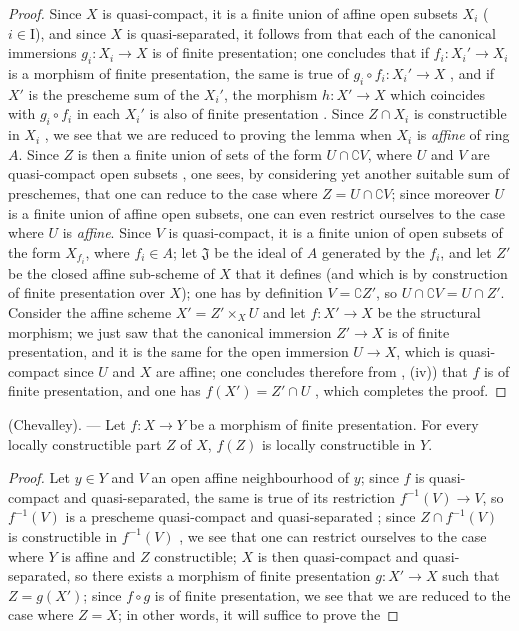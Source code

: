 \begin{proof}
Since $X$ is quasi-compact, it is a finite union of affine open subsets $X_i$ ($i\in\mathrm{I}$), and since $X$ is quasi-separated, it follows from  that each of the canonical immersions $g_i:X_i\to X$ is of finite presentation; one concludes that if $f_i:X_i'\to X_i$ is a morphism of finite presentation, the same is true of $g_i\circ f_i:X_i'\to X$ , and if $X'$ is the prescheme sum of the $X_i'$, the morphism $h:X'\to X$ which coincides with $g_i\circ f_i$ in each $X_i'$ is also of finite presentation .
Since $Z\cap X_i$ is constructible in $X_i$ , we see that we are reduced to proving the lemma when $X_i$ is \emph{affine} of ring $A$.
Since $Z$ is then a finite union of sets of the form $U\cap\complement V$, where $U$ and $V$ are
quasi-compact open subsets , one sees, by considering yet another suitable sum of preschemes, that one can reduce to the case where $Z=U\cap\complement V$; since moreover $U$ is a finite union of affine open subsets, one can even restrict ourselves to the case where $U$ is \emph{affine}.
Since $V$ is quasi-compact, it is a finite union of open subsets of the form $X_{f_i}$, where $f_i\in A$; let $\mathfrak{J}$ be the ideal of $A$ generated by the $f_i$, and let $Z'$ be the closed affine sub-scheme of $X$ that it defines (and which is by construction of finite presentation over $X$); one has by definition $V=\complement Z'$, so $U\cap\complement V=U\cap Z'$.
Consider the affine scheme $X'=Z'\times_X U$
and let $f:X'\to X$ be the structural morphism; we just saw that the canonical immersion $Z'\to X$ is of finite presentation, and it is the same for the open immersion $U\to X$, which is quasi-compact since $U$ and $X$ are affine; one concludes therefore from , (iv)) that $f$ is of finite presentation, and one has $f(X')=Z'\cap U$ , which completes the proof.
\end{proof}

\begin{theorem}[1.8.4]
\label{IV.1.8.4}
\textup{(Chevalley).} ---
Let $f:X\to Y$ be a morphism of finite presentation.
For every locally constructible part $Z$ of $X$, $f(Z)$ is locally constructible in $Y$.
\end{theorem}

\begin{proof}
Let $y\in Y$ and $V$ an open affine neighbourhood of $y$; since $f$ is quasi-compact and quasi-separated, the same is true of its restriction $f^{-1}(V)\to V$, so $f^{-1}(V)$ is a prescheme quasi-compact and quasi-separated ; since $Z\cap f^{-1}(V)$ is constructible in $f^{-1}(V)$ , we see that one can restrict ourselves to the case where $Y$ is affine and $Z$ constructible; $X$ is then quasi-compact and quasi-separated, so  there exists a morphism of finite presentation $g:X'\to X$ such that $Z=g(X')$; since $f\circ g$ is of finite presentation, we see that we are reduced to the case where $Z=X$; in other words, it will suffice to prove the
\end{proof}

